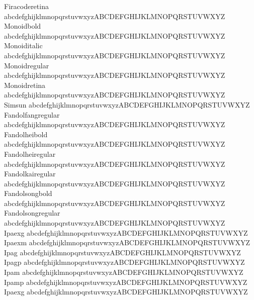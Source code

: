 \begin{tabbing}
Firacoderetina \> {\mktsFontfileFiracoderetina{}abcdefghijklmnopqrstuvwxyzABCDEFGHIJKLMNOPQRSTUVWXYZ} \\
Monoidbold \> {\mktsFontfileMonoidbold{}abcdefghijklmnopqrstuvwxyzABCDEFGHIJKLMNOPQRSTUVWXYZ} \\
Monoiditalic \> {\mktsFontfileMonoiditalic{}abcdefghijklmnopqrstuvwxyzABCDEFGHIJKLMNOPQRSTUVWXYZ} \\
Monoidregular \> {\mktsFontfileMonoidregular{}abcdefghijklmnopqrstuvwxyzABCDEFGHIJKLMNOPQRSTUVWXYZ} \\
Monoidretina \> {\mktsFontfileMonoidretina{}abcdefghijklmnopqrstuvwxyzABCDEFGHIJKLMNOPQRSTUVWXYZ} \\
Simsun \> {\mktsFontfileSimsun{}abcdefghijklmnopqrstuvwxyzABCDEFGHIJKLMNOPQRSTUVWXYZ} \\
Fandolfangregular \> {\mktsFontfileFandolfangregular{}abcdefghijklmnopqrstuvwxyzABCDEFGHIJKLMNOPQRSTUVWXYZ} \\
Fandolheibold \> {\mktsFontfileFandolheibold{}abcdefghijklmnopqrstuvwxyzABCDEFGHIJKLMNOPQRSTUVWXYZ} \\
Fandolheiregular \> {\mktsFontfileFandolheiregular{}abcdefghijklmnopqrstuvwxyzABCDEFGHIJKLMNOPQRSTUVWXYZ} \\
Fandolkairegular \> {\mktsFontfileFandolkairegular{}abcdefghijklmnopqrstuvwxyzABCDEFGHIJKLMNOPQRSTUVWXYZ} \\
Fandolsongbold \> {\mktsFontfileFandolsongbold{}abcdefghijklmnopqrstuvwxyzABCDEFGHIJKLMNOPQRSTUVWXYZ} \\
Fandolsongregular \> {\mktsFontfileFandolsongregular{}abcdefghijklmnopqrstuvwxyzABCDEFGHIJKLMNOPQRSTUVWXYZ} \\
Ipaexg \> {\mktsFontfileIpaexg{}abcdefghijklmnopqrstuvwxyzABCDEFGHIJKLMNOPQRSTUVWXYZ} \\
Ipaexm \> {\mktsFontfileIpaexm{}abcdefghijklmnopqrstuvwxyzABCDEFGHIJKLMNOPQRSTUVWXYZ} \\
Ipag \> {\mktsFontfileIpag{}abcdefghijklmnopqrstuvwxyzABCDEFGHIJKLMNOPQRSTUVWXYZ} \\
Ipagp \> {\mktsFontfileIpagp{}abcdefghijklmnopqrstuvwxyzABCDEFGHIJKLMNOPQRSTUVWXYZ} \\
Ipam \> {\mktsFontfileIpam{}abcdefghijklmnopqrstuvwxyzABCDEFGHIJKLMNOPQRSTUVWXYZ} \\
Ipamp \> {\mktsFontfileIpamp{}abcdefghijklmnopqrstuvwxyzABCDEFGHIJKLMNOPQRSTUVWXYZ} \\
Ipaexg \> {\mktsFontfileIpaexg{}abcdefghijklmnopqrstuvwxyzABCDEFGHIJKLMNOPQRSTUVWXYZ} \\

\end{tabbing}
